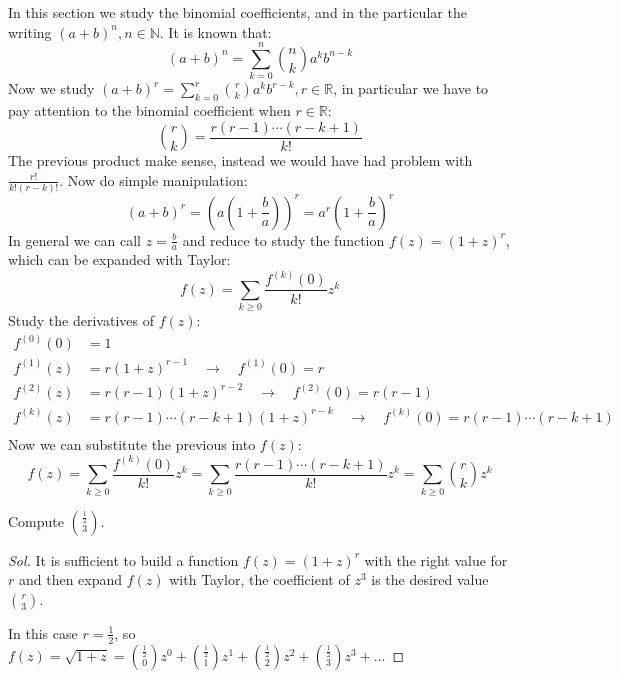 In this section we study the binomial coefficients, and in the
particular the writing $(a + b)^n, n\in \mathbb{N}$. It is known that:
\begin{displaymath}
  (a+b)^n = \sum_{k=0}^{n}{{{n}\choose{k}}a^k b^{n-k} } 
\end{displaymath}
Now we study $(a + b)^r = \sum_{k=0}^{r}{{{r}\choose{k}}a^k b^{r-k} },
r\in \mathbb{R}$, in particular we have to pay attention to the
binomial coefficient when $r\in \mathbb{R}$:
\begin{displaymath}
  {{r}\choose{k}}  = \frac{r(r-1)\cdots(r-k+1)}{k!}
\end{displaymath}
The previous product make sense, instead we would have had problem
with $ \frac{r!}{k!(r-k)!} $. Now do simple manipulation:
\begin{displaymath}
  (a+b)^r = \left( a\left(1 +  \frac{b}{a}\right)\right)^r =
  a^r \left(1 +  \frac{b}{a}\right)^r
\end{displaymath}
In general we can call $z= \frac{b}{a} $ and reduce to study the
function $f(z)=(1+z)^r$, which can be expanded with Taylor:
\begin{displaymath}
  f(z) = \sum_{k \geq 0}{ \frac{f^{(k)}(0)}{k!} z^k } 
\end{displaymath}
Study the derivatives of $f(z)$:
\begin{displaymath}
  \begin{split}
    f^{(0)}(0) &= 1 \\
    f^{(1)}(z) &= r(1+z)^{r-1} \quad \rightarrow
    \quad f^{(1)}(0) =    r\\
    f^{(2)}(z) &= r(r-1)(1+z)^{r-2} \quad \rightarrow
    \quad f^{(2)}(0) = r(r-1)\\
    f^{(k)}(z) &= r(r-1)\cdots(r-k+1)(1+z)^{r-k}
    \quad \rightarrow \quad f^{(k)}(0) = r(r-1)\cdots(r-k+1)\\
  \end{split}
\end{displaymath}
Now we can substitute the previous into $f(z)$:
\begin{displaymath}
  f(z) = \sum_{k \geq 0}{ \frac{f^{(k)}(0)}{k!} z^k } =
  \sum_{k \geq 0}{ \frac{r(r-1)\cdots(r-k+1)}{k!} z^k } =
  \sum_{k \geq 0}{ {{r}\choose{k}} z^k }
\end{displaymath}

\begin{exercise}
  \label{exercise:first-on-comb-with-real}
  Compute ${{ \frac{1}{2} }\choose{3}} $.
\end{exercise}
\begin{proof}[Sol]
  It is sufficient to build a function $f(z) = (1+z)^r$ with the right
  value for $r$ and then expand $f(z)$ with Taylor, the coefficient of
  $z^3$ is the desired value ${{ r }\choose{3}} $.
  
  In this case $r= \frac{1}{2} $, so $f(z) = \sqrt{1+z} =
  {{\frac{1}{2}}\choose{0}}z^0 + {{\frac{1}{2}}\choose{1}}z^1 +
  {{\frac{1}{2}}\choose{2}}z^2 + {{\frac{1}{2}}\choose{3}}z^3 + \ldots$
\end{proof}

